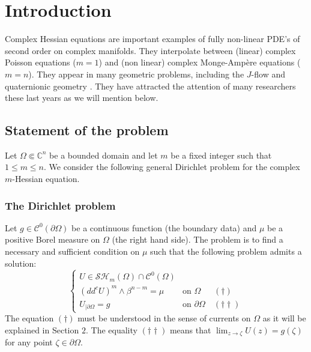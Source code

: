 \documentclass[JEP,XML,SOM,Unicode]{cedram}
\theoremstyle{definition}
\renewcommand{\C}{\mathbb{C}}
\newcommand{\Cc}{\mathcal{C}}
\begin{document}
\maketitle

\tableofcontents
\mainmatter

\section{Introduction}\label{sec:1}

Complex Hessian equations are important examples of fully non-linear PDE's of second order on complex manifolds. They interpolate between (linear) complex \hbox{Poisson} equations ($m = 1$) and (non linear) complex Monge-Ampère equations \hbox{($m=n$)}.
They appear in many geometric problems, including the $J$-flow
\cite{SW} and quaternionic geometry \cite{AV}. They have attracted the attention of many researchers these last years as we will mention below.

\subsection{Statement of the problem}

Let $\Omega \Subset \C^n$ be a bounded domain and let $m$ be a fixed integer such that $1 \leq m \leq n$.
We consider the following general Dirichlet problem for the complex $m$-Hessian equation.

\subsubsection*{The Dirichlet problem} Let $g \in \Cc^{0} (\partial \Omega)$ be a continuous function (the boundary data) and $\mu$ be a positive Borel measure on $\Omega$ (the right hand side). The problem is to find a necessary and sufficient condition on $\mu$ such that the following problem admits a solution:
\begin{equation}\label{eq:DirPb}
\begin{cases}
U \in \mathcal{SH}_m (\Omega) \cap \mathcal {C}^{0} ({\Omega}) \\
(dd^c U)^m \wedge \beta^{n - m} = \mu &\text{on } \Omega\;\;\quad(\dag)\\
U_{\mid \partial \Omega} = g & \text{on } \partial \Omega\quad(\dag \dag)
\end{cases}
\end{equation}
The equation $(\dag)$ must be understood in the sense of currents on $\Omega$ as it will be explained in Section $2$.
The equality $(\dag \dag)$ means that $\lim_{z \to \zeta} U (z) = g (\zeta)$ for any point $\zeta \in \partial \Omega$.
\end{document}
